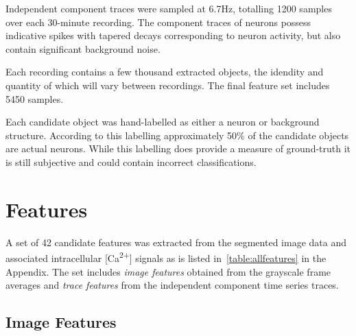 \documentclass[10pt]{article}
\newcommand{\calcium}[0]{Ca\textsuperscript{2+}}
\begin{document}
Independent component traces were sampled at \num{6.7}\si{Hz}, totalling \num{1200} samples over each \num{30}-minute recording. The component traces of neurons possess indicative spikes with tapered decays corresponding to neuron activity, but also contain significant background noise.

Each recording contains a few thousand extracted objects, the idendity and quantity of which will vary between recordings.
The final feature set includes \num{5450} samples.

Each candidate object was hand-labelled as either a neuron or background structure. 
According to this labelling approximately \num{50}\% of the candidate objects are actual neurons.
While this labelling does provide a measure of ground-truth it is still subjective and could contain incorrect classifications.

\section{Features}

A set of \num{42} candidate features was extracted from the segmented image data and associated intracellular [\calcium] signals as is listed in~\cref{table:allfeatures} in the Appendix.
The set includes \emph{image features} obtained from the grayscale frame averages and \emph{trace features} from the independent component time series traces.

\subsection{Image Features}
\end{document}
